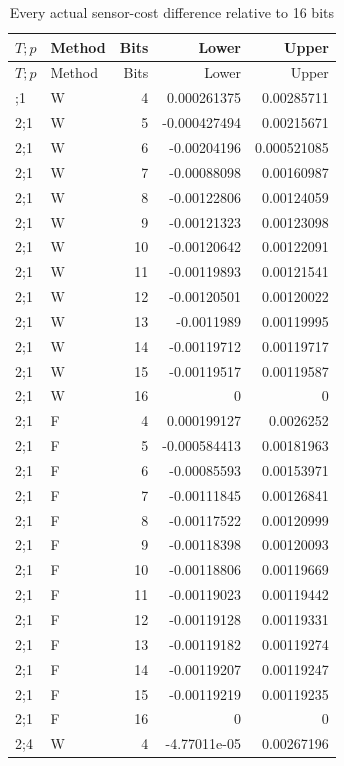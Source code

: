 {\small
\setlength{\tabcolsep}{3.5pt}
\begin{longtable}{@{}llrrr@{}}
\caption{Every actual sensor-cost difference relative to 16 bits}\label{tab:all-sensor49}\\
\toprule
$T;p$ & Method & Bits & Lower & Upper \\
\midrule
\endfirsthead
\toprule
$T;p$ & Method & Bits & Lower & Upper \\
\midrule
\endhead
\bottomrule
\endfoot
2;1 & W & 4 & 0.000261375 & 0.00285711 \\
2;1 & W & 5 & -0.000427494 & 0.00215671 \\
2;1 & W & 6 & -0.00204196 & 0.000521085 \\
2;1 & W & 7 & -0.00088098 & 0.00160987 \\
2;1 & W & 8 & -0.00122806 & 0.00124059 \\
2;1 & W & 9 & -0.00121323 & 0.00123098 \\
2;1 & W & 10 & -0.00120642 & 0.00122091 \\
2;1 & W & 11 & -0.00119893 & 0.00121541 \\
2;1 & W & 12 & -0.00120501 & 0.00120022 \\
2;1 & W & 13 & -0.0011989 & 0.00119995 \\
2;1 & W & 14 & -0.00119712 & 0.00119717 \\
2;1 & W & 15 & -0.00119517 & 0.00119587 \\
2;1 & W & 16 & 0 & 0 \\
2;1 & F & 4 & 0.000199127 & 0.0026252 \\
2;1 & F & 5 & -0.000584413 & 0.00181963 \\
2;1 & F & 6 & -0.00085593 & 0.00153971 \\
2;1 & F & 7 & -0.00111845 & 0.00126841 \\
2;1 & F & 8 & -0.00117522 & 0.00120999 \\
2;1 & F & 9 & -0.00118398 & 0.00120093 \\
2;1 & F & 10 & -0.00118806 & 0.00119669 \\
2;1 & F & 11 & -0.00119023 & 0.00119442 \\
2;1 & F & 12 & -0.00119128 & 0.00119331 \\
2;1 & F & 13 & -0.00119182 & 0.00119274 \\
2;1 & F & 14 & -0.00119207 & 0.00119247 \\
2;1 & F & 15 & -0.00119219 & 0.00119235 \\
2;1 & F & 16 & 0 & 0 \\
2;4 & W & 4 & -4.77011e-05 & 0.00267196 \\

\end{longtable}}
